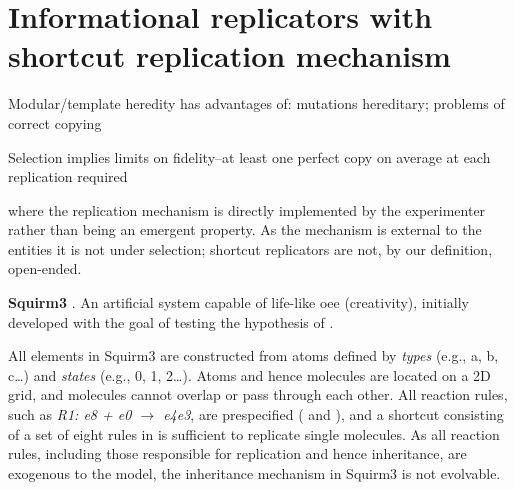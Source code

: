 \section{Informational replicators with shortcut replication mechanism}
\begin{NOTES}
Modular/template heredity has advantages of: mutations hereditary; problems of correct copying \parencite{Eigen1977}

Selection implies limits on fidelity--at least one perfect copy on average at each replication required \parencite{Eigen1977}

\Cite{BanzhafBaumgaertnerBeslonEtAl2016} where the replication mechanism is directly implemented by the experimenter rather than being an emergent property. As the mechanism is external to the entities it is not under selection; shortcut replicators are not, by our definition, open-ended.


\textbf{Squirm3} \parencite{Hutton2007,Hutton2002}. An artificial system capable of life-like \gls{oee} (creativity), initially developed with the goal of testing the hypothesis of \textcite{Taylor2001} \parencite[p.341]{Hutton2002}.

All elements in Squirm3 are constructed from atoms defined by \emph{types} (e.g., a, b, c\dots) and \emph{states} (e.g., 0, 1, 2\dots). Atoms and hence molecules are located on a 2D grid, and molecules cannot overlap or pass through each other. All reaction rules, such as \emph{R1: e8 + e0 $\rightarrow$ e4e3}, are prespecified (\cite[p.4]{Hutton2007} and \cite[p.49]{Faulconbridge2011}), and a shortcut consisting of a set of eight rules in \cite{Hutton2002} is sufficient to replicate single molecules. As all reaction rules, including those responsible for replication and hence inheritance, are exogenous to the model, the inheritance mechanism in Squirm3 is not evolvable. 


\end{NOTES}
